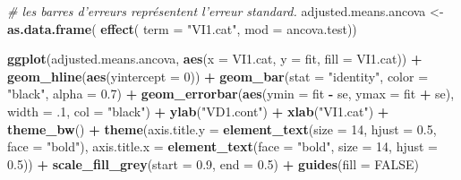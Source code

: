 \documentclass[
]{book}
\newenvironment{Shaded}{\begin{snugshade}}{\end{snugshade}}
\newcommand{\CommentTok}[1]{\textcolor[rgb]{0.56,0.35,0.01}{\textit{#1}}}
\newcommand{\DataTypeTok}[1]{\textcolor[rgb]{0.13,0.29,0.53}{#1}}
\newcommand{\DecValTok}[1]{\textcolor[rgb]{0.00,0.00,0.81}{#1}}
\newcommand{\FloatTok}[1]{\textcolor[rgb]{0.00,0.00,0.81}{#1}}
\newcommand{\KeywordTok}[1]{\textcolor[rgb]{0.13,0.29,0.53}{\textbf{#1}}}
\newcommand{\NormalTok}[1]{#1}
\newcommand{\OperatorTok}[1]{\textcolor[rgb]{0.81,0.36,0.00}{\textbf{#1}}}
\newcommand{\OtherTok}[1]{\textcolor[rgb]{0.56,0.35,0.01}{#1}}
\newcommand{\StringTok}[1]{\textcolor[rgb]{0.31,0.60,0.02}{#1}}
\begin{document}
\begin{Shaded}
\begin{Highlighting}[]
\CommentTok{# les barres d'erreurs représentent l'erreur standard.}
\NormalTok{adjusted.means.ancova <-}\StringTok{ }\KeywordTok{as.data.frame}\NormalTok{(}
  \KeywordTok{effect}\NormalTok{(}
    \DataTypeTok{term =} \StringTok{"VI1.cat"}\NormalTok{, }
    \DataTypeTok{mod =}\NormalTok{ ancova.test))}

\KeywordTok{ggplot}\NormalTok{(adjusted.means.ancova, }
       \KeywordTok{aes}\NormalTok{(}\DataTypeTok{x =}\NormalTok{ VI1.cat, }\DataTypeTok{y =}\NormalTok{ fit, }\DataTypeTok{fill =}\NormalTok{ VI1.cat)) }\OperatorTok{+}
\StringTok{  }\KeywordTok{geom_hline}\NormalTok{(}\KeywordTok{aes}\NormalTok{(}\DataTypeTok{yintercept =} \DecValTok{0}\NormalTok{)) }\OperatorTok{+}\StringTok{ }
\StringTok{  }\KeywordTok{geom_bar}\NormalTok{(}\DataTypeTok{stat =} \StringTok{"identity"}\NormalTok{, }\DataTypeTok{color =} \StringTok{"black"}\NormalTok{, }\DataTypeTok{alpha =} \FloatTok{0.7}\NormalTok{) }\OperatorTok{+}
\StringTok{  }\KeywordTok{geom_errorbar}\NormalTok{(}\KeywordTok{aes}\NormalTok{(}\DataTypeTok{ymin =}\NormalTok{ fit }\OperatorTok{-}\StringTok{ }\NormalTok{se, }
                    \DataTypeTok{ymax =}\NormalTok{ fit }\OperatorTok{+}\StringTok{ }\NormalTok{se), }
                \DataTypeTok{width =} \FloatTok{.1}\NormalTok{, }\DataTypeTok{col =} \StringTok{"black"}\NormalTok{) }\OperatorTok{+}
\StringTok{  }\KeywordTok{ylab}\NormalTok{(}\StringTok{"VD1.cont"}\NormalTok{) }\OperatorTok{+}\StringTok{ }\KeywordTok{xlab}\NormalTok{(}\StringTok{"VI1.cat"}\NormalTok{) }\OperatorTok{+}\StringTok{ }
\StringTok{  }\KeywordTok{theme_bw}\NormalTok{() }\OperatorTok{+}\StringTok{ }
\StringTok{  }\KeywordTok{theme}\NormalTok{(}\DataTypeTok{axis.title.y =} \KeywordTok{element_text}\NormalTok{(}\DataTypeTok{size =} \DecValTok{14}\NormalTok{, }\DataTypeTok{hjust =} \FloatTok{0.5}\NormalTok{, }\DataTypeTok{face =} \StringTok{"bold"}\NormalTok{), }
        \DataTypeTok{axis.title.x =} \KeywordTok{element_text}\NormalTok{(}\DataTypeTok{face =} \StringTok{"bold"}\NormalTok{, }\DataTypeTok{size =} \DecValTok{14}\NormalTok{, }\DataTypeTok{hjust =} \FloatTok{0.5}\NormalTok{)) }\OperatorTok{+}\StringTok{ }
\StringTok{  }\KeywordTok{scale_fill_grey}\NormalTok{(}\DataTypeTok{start =} \FloatTok{0.9}\NormalTok{, }\DataTypeTok{end =} \FloatTok{0.5}\NormalTok{) }\OperatorTok{+}
\StringTok{  }\KeywordTok{guides}\NormalTok{(}\DataTypeTok{fill =} \OtherTok{FALSE}\NormalTok{)}
\end{Highlighting}
\end{Shaded}
\end{document}
